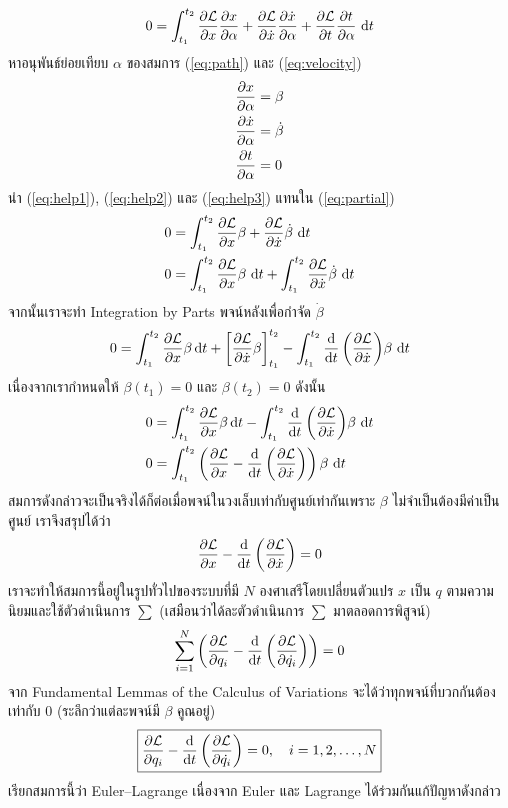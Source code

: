 \documentclass[a4paper,12pt]{article}
\begin{document}
\begin{equation}
	0=\int_{t_1}^{t_2}\diffp{\mathcal{L}}{x}\diffp{x}{\alpha}+\diffp{\mathcal{L}}{\dot{x}}\diffp{\dot{x}}{\alpha}+\diffp{\mathcal{L}}{t}\diffp{t}{\alpha}\,\dl t
	\label{eq:partial}\end{equation}
หาอนุพันธ์ย่อยเทียบ \(\alpha\) ของสมการ (\ref{eq:path}) และ (\ref{eq:velocity})
\begin{align}
	\diffp{x}{\alpha}       & =\beta\label{eq:help1}       \\
	\diffp{\dot{x}}{\alpha} & =\dot{\beta}\label{eq:help2} \\
	\diffp{t}{\alpha}       & =0\label{eq:help3}
\end{align}
นำ (\ref{eq:help1}), (\ref{eq:help2}) และ (\ref{eq:help3}) แทนใน (\ref{eq:partial})
\begin{align}
	0 & =\int_{t_1}^{t_2}\diffp{\mathcal{L}}{x}\beta+\diffp{\mathcal{L}}{\dot{x}}\dot{\beta}\,\dl t \label{eq:partial2}                        \\
	0 & =\int_{t_1}^{t_2}\diffp{\mathcal{L}}{x}\beta\,\dl t+\int_{t_1}^{t_2}\diffp{\mathcal{L}}{\dot{x}}\dot{\beta}\,\dl t \nonumber
\end{align}
จากนั้นเราจะทำ Integration by Parts พจน์หลังเพื่อกำจัด \(\dot{\beta}\)
\begin{equation*}
	0=\int_{t_1}^{t_2}\diffp{\mathcal{L}}{x}\beta\dl t+\left[\diffp{\mathcal{L}}{\dot{x}}\beta\right]_{t_1}^{t_2}-\int_{t_1}^{t_2}\diff*{\left(\diffp{\mathcal{L}}{\dot{x}}\right)}{t}\beta\,\dl t
\end{equation*}
เนื่องจากเรากำหนดให้ \(\beta(t_1)=0\) และ \(\beta(t_2)=0\) ดังนั้น
\begin{align*}
	0 & =\int_{t_1}^{t_2}\diffp{\mathcal{L}}{x}\beta\dl t-\int_{t_1}^{t_2}\diff*{\left(\diffp{\mathcal{L}}{\dot{x}}\right)}{t}\beta\,\dl t \\
	0 & =\int_{t_1}^{t_2}\left(\diffp{\mathcal{L}}{x}-\diff*{\left(\diffp{\mathcal{L}}{\dot{x}}\right)}{t}\right)\beta\,\dl t
\end{align*}
สมการดังกล่าวจะเป็นจริงได้ก็ต่อเมื่อพจน์ในวงเล็บเท่ากับศูนย์เท่ากันเพราะ \(\beta\) ไม่จำเป็นต้องมีค่าเป็นศูนย์ เราจึงสรุปได้ว่า
\begin{equation*}
	\diffp{\mathcal{L}}{x}-\diff*{\left(\diffp{\mathcal{L}}{\dot{x}}\right)}{t}=0
\end{equation*}
เราจะทำให้สมการนี้อยู่ในรูปทั่วไปของระบบที่มี \(N\) องศาเสรีโดยเปลี่ยนตัวแปร \(x\) เป็น \(q\) ตามความนิยมและใช้ตัวดำเนินการ \(\sum\) (เสมือนว่าได้ละตัวดำเนินการ \(\sum\) มาตลอดการพิสูจน์)
\begin{equation}
	\sum_{i=1}^{N}\left( \diffp{\mathcal{L}}{q_i}-\diff*{\left(\diffp{\mathcal{L}}{\dot{q_i}}\right)}{t}\right) =0
\end{equation} 
จาก Fundamental Lemmas of the Calculus of Variations จะได้ว่าทุกพจน์ที่บวกกันต้องเท่ากับ 0 (ระลึกว่าแต่ละพจน์มี \(\beta\) คูณอยู่)
\begin{equation}
	\boxed{\diffp{\mathcal{L}}{q_i}-\diff*{\left(\diffp{\mathcal{L}}{\dot{q_i}}\right)}{t} =0,\quad i=1,2,\dots,N}\label{eq:e-l}
\end{equation} 
เรียกสมการนี้ว่า Euler–Lagrange เนื่องจาก Euler และ Lagrange ได้ร่วมกันแก้ปัญหาดังกล่าว
\end{document}
